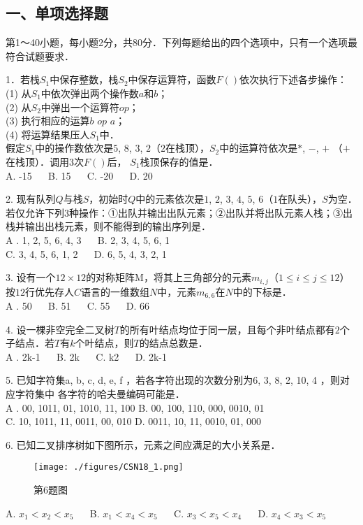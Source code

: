 
\subsection{一、单项选择题}
第1～40小题，每小题2分，共80分．下列每题给出的四个选项中，只有一个选项最符合试题要求．

1．若栈$S_1$中保存整数，栈$S_2$中保存运算符，函数$F()$依次执行下述各步操作： \\
(1) 从$S_1$中依次弹出两个操作数$a$和$b$； \\
(2) 从$S_2$中弹出一个运算符$op$； \\
(3) 执行相应的运算$b$ $op$ $a$； \\
(4) 将运算结果压人$S_1$中． \\
假定$S_1$中的操作数依次是$5$, $8$, $3$, $2$（$2$在栈顶），$S_2$中的运算符依次是$*$, $-$, $+$ （$+$在栈顶）．调用$3$次$F()$后， $S_1$栈顶保存的值是． \\
A. -15 $\quad$  B. 15 $\quad$ C. -20 $\quad$ D. 20

2. 现有队列$Q$与栈$S$，初始时$Q$中的元素依次是$1$, $2$, $3$, $4$, $5$, $6$（$1$在队头），$S$为空．若仅允许下列$3$种操作：①出队并输出出队元素；②出队并将出队元素人栈；③出栈并输出出栈元素，则不能得到的输出序列是． \\
A . 1, 2, 5, 6, 4, 3 $\quad$ B. 2, 3, 4, 5, 6, 1 \\
C. 3, 4, 5, 6, 1, 2 $\quad$ D. 6, 5, 4, 3, 2, 1

3. 设有一个$12\times12$的对称矩阵M，将其上三角部分的元素$m_{i, j}$（$1\leqslant i\leqslant j\leqslant12$）按$12$行优先存人$C$语言的一维数组$N$中，元素$m_{6,6}$在$N$中的下标是． \\
A . 50 $\quad$ B. 51 $\quad$ C. 55 $\quad$ D. 66

4. 设一棵非空完全二叉树$T$的所有叶结点均位于同一层，且每个非叶结点都有$2$个子结点．若$T$有$k$个叶结点，则$T$的结点总数是． \\
A . 2k-1 $\quad$ B. 2k $\quad$ C. k2 $\quad$ D. 2k-1

5. 已知字符集{a, b, c, d, e, f} ，若各字符出现的次数分别为6, 3, 8, 2, 10, 4 ，则对应字符集中
各字符的哈夫曼编码可能是． \\
A . 00, 1011, 01, 1010, 11, 100 B. 00, 100, 110, 000, 0010, 01 \\
C. 10, 1011, 11, 0011, 00, 010 D. 0011, 10, 11, 0010, 01, 000

6. 已知二叉排序树如下图所示，元素之间应满足的大小关系是．
\begin{figure}[ht]
\centering
\texttt{[image: ./figures/CSN18\_1.png]}
\caption{第6题图} \label{CSN18_fig1}
\end{figure}
A. $x_1<x_2<x_5$ $\quad$ B. $x_1<x_4<x_5$ $\quad$ C. $x_3<x_5<x_4$ $\quad$ D. $x_4<x_3<x_5$

